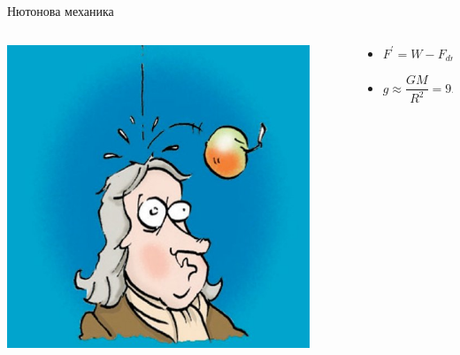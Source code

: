 \documentclass[10pt,a4paper]{beamer}
\begin{document}
        \begin{frame}{ Нютонова механика }
            \begin{columns}
                \begin{column}{0.5\textwidth}
                    \includegraphics[width=0.9\textwidth]{images/newton_apple.jpg}
                \end{column}
                \begin{column}{0.5\textwidth}
                    \begin{itemize}
                        \item $ F^{\prime} = W - F_{drag} $
                        \item $ g \approx \dfrac{GM}{R^2} = 9.81 \mbox{m/s}^2 $
                    \end{itemize}
                \end{column}
            \end{columns}
        \end{frame}
        
\end{document}
